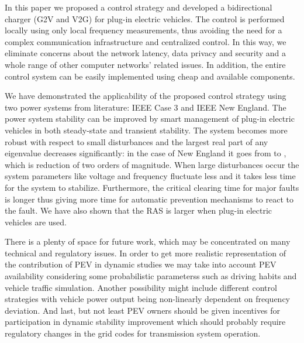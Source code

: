 \documentclass[final,12pt]{elsarticle}
\begin{document}
In this paper we proposed a control strategy 
and developed a bidirectional charger (G2V and V2G) for plug-in
electric vehicles.
The control is performed locally using only local frequency measurements, thus avoiding the
need for a complex communication infrastructure and centralized control. In this
way, we eliminate concerns about the network latency, data privacy and security
and a whole range of other computer networks' related issues.  In addition, the
entire control system can be easily implemented using cheap and available
components.

We have demonstrated the applicability of the proposed control strategy using
two power systems from literature: IEEE Case 3 and IEEE New England. The power
system stability can be improved by smart management of plug-in electric
vehicles in both steady-state and transient stability. The system becomes more
robust with respect to small disturbances and the largest real part of any
eigenvalue decreases significantly: in the case of New England it goes from
 to , which is reduction of two
orders of magnitude. When large disturbances occur the system parameters like
voltage and frequency fluctuate less and it takes less time for the system to stabilize.
Furthermore, the critical clearing time for major faults is longer thus giving
more time for automatic prevention mechanisms to react to the fault.  We have
also shown that the RAS is larger when plug-in electric vehicles are
used.

There is a plenty of space for future work, which may be concentrated on many
technical and regulatory issues. In order to get more realistic representation
of the contribution of PEV in dynamic studies we may take into account PEV
availability considering some probabilistic parameterss such as driving habits
and vehicle traffic simulation. Another possibility might include different
control strategies with vehicle power output being non-linearly dependent on
frequency deviation. And last, but not least PEV owners should be given
incentives for participation in dynamic stability improvement which should
probably require regulatory changes in the grid codes for transmission system
operation.
\end{document}
